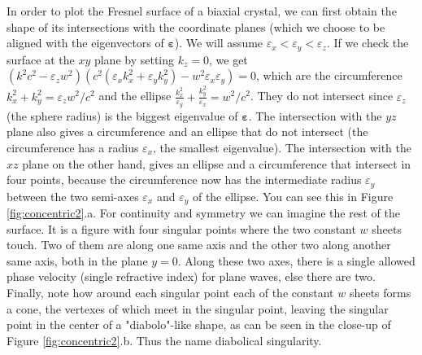 \documentclass[11pt, a4paper, twoside]{article} %
\begin{document}
In order to plot the Fresnel surface of a biaxial crystal, we can first obtain the shape of its intersections with the coordinate planes (which we choose to be aligned with the eigenvectors of $\pmb{\varepsilon}$). We will assume $\varepsilon_x<\varepsilon_y<\varepsilon_z$. If we check the surface at the $xy$ plane by setting $k_z=0$, we get $(k^2c^2-\varepsilon_zw^2)(c^2(\varepsilon_xk_x^2+\varepsilon_yk_y^2)-w^2\varepsilon_x\varepsilon_y)=0$, which are the circumference $k_x^2+k_y^2=\varepsilon_zw^2/c^2$ and the ellipse $\frac{k_x^2}{\varepsilon_y}+\frac{k_y^2}{\varepsilon_x}=w^2/c^2$. They do not intersect since $\varepsilon_z$ (the sphere radius) is the biggest eigenvalue of $\pmb{\varepsilon}$. The intersection with the $yz$ plane also gives a circumference and an ellipse that do not intersect (the circumference has a radius $\varepsilon_x$, the smallest eigenvalue). The intersection with the $xz$ plane on the other hand, gives an ellipse and a circumference that intersect in four points, because the circumference now has the intermediate radius $\varepsilon_y$ between the two semi-axes $\varepsilon_x$ and $\varepsilon_y$ of the ellipse. You can see this in Figure \ref{fig:concentric2}.a. For continuity and symmetry we can imagine the rest of the surface. It is a figure with four singular points where the two constant $w$ sheets touch. Two of them are along one same axis and the other two along another same axis, both in the plane $y=0$. Along these two axes, there is a single allowed phase velocity (single refractive index) for plane waves, else there are two. Finally, note how around each singular point each of the constant $w$ sheets forms a cone, the vertexes of which meet in the singular point, leaving the singular point in the center of a "diabolo"-like shape, as can be seen in the close-up of Figure \ref{fig:concentric2}.b. Thus the name diabolical singularity.\vspace{-0.15cm}
\end{document}
